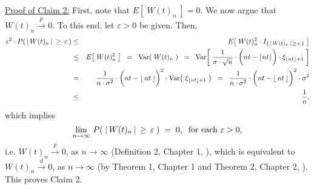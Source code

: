 \begin{enumerate}
		\vskip 0.5cm
		\noindent
		\underline{Proof of Claim 2:}\quad
		First, note that $E\!\left[\;W(t)_{n}\;\right] = 0$.
		We now argue that $W(t)_{n} \overset{p}{\longrightarrow} 0$.
		To this end, let $\varepsilon > 0$ be given.
		Then,
		\begin{eqnarray*}
		\varepsilon^{2} \cdot P\!\left(\,\vert\,W(t)_{n}\,\vert\,\geq\,\varepsilon\,\right)
		&\leq& E\!\left[\;W(t)_{n}^{2} \cdot I_{\{\,\vert\,W(t)_{n}\,\vert\,\geq\,\varepsilon\,\}}\;\right]
		\\
		&\leq& E\!\left[\;W(t)_{n}^{2}\;\right]
		\;\;=\;\; \Var\!\left(\;W(t)_{n}\;\right)
		\;\;=\;\;
			\Var\!\left[\;
				\dfrac{1}{\sigma\cdot\sqrt{n}}
				\cdot
				\left(\overset{{\color{white}1}}{nt} - \lfloor nt \rfloor\right)
				\cdot
				\xi_{\lfloor nt \rfloor + 1}
			\;\right]
		\\
		&=&
			\dfrac{1}{n\cdot\sigma^{2}}
			\cdot
			\left(\overset{{\color{white}1}}{nt} - \lfloor\,nt\,\rfloor\right)^{2}
			\cdot
			\Var\!\left(\;\xi_{\lfloor nt \rfloor + 1}\;\right)
		\;\;=\;\;
			\dfrac{1}{n\cdot\sigma^{2}}
			\cdot
			\left(\overset{{\color{white}1}}{nt} - \lfloor\,nt\,\rfloor\right)^{2}
			\cdot
			\sigma^{2}
		\\
		&\leq& \dfrac{1}{n},
		\end{eqnarray*}
		which implies
		\begin{equation*}
		\lim_{n\rightarrow\infty}\,P\!\left(\;\vert\,W(t)_{n}\,\vert\,\geq\,\varepsilon\;\right) \; = \; 0,
		\;\;
		\textnormal{for each $\varepsilon > 0$},
		\end{equation*}
		i.e. $W(t)_{n}\overset{p}{\longrightarrow}0$, as $n\longrightarrow\infty$
		(Definition 2, Chapter 1, \cite{Ferguson1996}),
		which is equivalent to $W(t)_{n}\overset{d}{\longrightarrow}0$, as $n\longrightarrow\infty$
		(by Theorem 1, Chapter 1 and Theorem 2, Chapter 2, \cite{Ferguson1996}).
		This proves Claim 2.


\end{enumerate}
